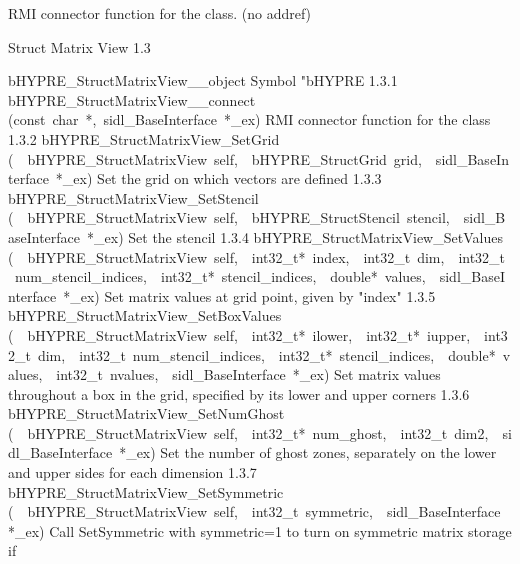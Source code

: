 \documentclass{article}
\begin{document}
\begin{cxxentry}
\begin{cxxentry}
\begin{cxxvariable}
\begin{cxxdoc}
RMI connector function for the class. (no addref)
\end{cxxdoc}
\end{cxxvariable}
\end{cxxentry}
\begin{cxxentry}
{}
        {Struct Matrix View}
        {}
        {
}
        {1.3}
\begin{cxxnames}
        {bHYPRE\_StructMatrixView\_\_object}
        {}
        {
Symbol "bHYPRE}
        {1.3.1}
        {bHYPRE\_StructMatrixView\_\_connect}
        {(const\ char\ *,\ sidl\_BaseInterface\ *\_ex)}
        {
RMI connector function for the class}
        {1.3.2}
        {bHYPRE\_StructMatrixView\_SetGrid}
        {(\ \ bHYPRE\_StructMatrixView\ self,\ \ bHYPRE\_StructGrid\ grid,\ \ sidl\_BaseInterface\ *\_ex)}
        {
Set the grid on which vectors are defined}
        {1.3.3}
        {bHYPRE\_StructMatrixView\_SetStencil}
        {(\ \ bHYPRE\_StructMatrixView\ self,\ \ bHYPRE\_StructStencil\ stencil,\ \ sidl\_BaseInterface\ *\_ex)}
        {
Set the stencil}
        {1.3.4}
        {bHYPRE\_StructMatrixView\_SetValues}
        {(\ \ bHYPRE\_StructMatrixView\ self,\ \ int32\_t*\ index,\ \ int32\_t\ dim,\ \ int32\_t\ num\_stencil\_indices,\ \ int32\_t*\ stencil\_indices,\ \ double*\ values,\ \ sidl\_BaseInterface\ *\_ex)}
        {
Set matrix values at grid point, given by "index"}
        {1.3.5}
        {bHYPRE\_StructMatrixView\_SetBoxValues}
        {(\ \ bHYPRE\_StructMatrixView\ self,\ \ int32\_t*\ ilower,\ \ int32\_t*\ iupper,\ \ int32\_t\ dim,\ \ int32\_t\ num\_stencil\_indices,\ \ int32\_t*\ stencil\_indices,\ \ double*\ values,\ \ int32\_t\ nvalues,\ \ sidl\_BaseInterface\ *\_ex)}
        {
Set matrix values throughout a box in the grid, specified by its lower
and upper corners}
        {1.3.6}
        {bHYPRE\_StructMatrixView\_SetNumGhost}
        {(\ \ bHYPRE\_StructMatrixView\ self,\ \ int32\_t*\ num\_ghost,\ \ int32\_t\ dim2,\ \ sidl\_BaseInterface\ *\_ex)}
        {
Set the number of ghost zones, separately on the lower and upper sides
for each dimension}
        {1.3.7}
        {bHYPRE\_StructMatrixView\_SetSymmetric}
        {(\ \ bHYPRE\_StructMatrixView\ self,\ \ int32\_t\ symmetric,\ \ sidl\_BaseInterface\ *\_ex)}
        {
Call SetSymmetric with symmetric=1 to turn on symmetric matrix storage if
}
\end{cxxnames}
\end{cxxentry}
\end{cxxentry}
\end{document}
